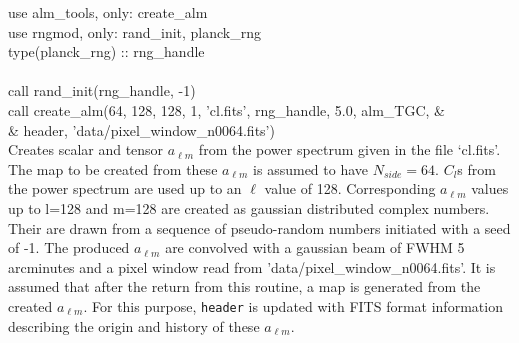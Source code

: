 \begin{example}
{
use alm\_tools, only: create\_alm \\
use rngmod, only: rand\_init, planck\_rng \\
type(planck\_rng) :: rng\_handle \\
\\
call rand\_init(rng\_handle, -1) \\
call create\_alm(64, 128, 128, 1, 'cl.fits', rng\_handle, 5.0, alm\_TGC, \&\\
 \&  header, 'data/pixel\_window\_n0064.fits')  \\
}
{
Creates scalar and tensor $a_{\ell m}$ from the power spectrum given in the file
`cl.fits'. The map to be created from these $a_{\ell m}$ is assumed to have
$N_{side}=64$. $C_l$s from the power spectrum are used up to an $\ell$ value of
128. 
Corresponding $a_{\ell m}$ values up to l=128 and m=128 are created as gaussian distributed
complex numbers. Their are drawn from a sequence of pseudo-random numbers
initiated with a seed of -1. 
The produced $a_{\ell m}$ are convolved with a gaussian beam of FWHM 5 arcminutes
and a pixel window read from 'data/pixel\_window\_n0064.fits'. It is assumed that after the return
from this routine, a map is generated from the created
$a_{\ell m}$. For this purpose, {\tt header} is updated with FITS format information
describing the origin and history of these $a_{\ell m}$.
}
\end{example}

